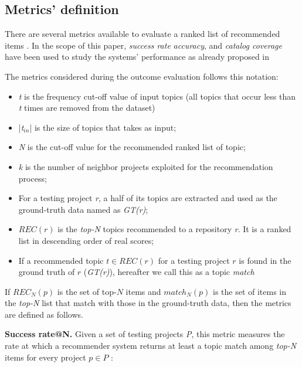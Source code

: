 \subsection{Metrics' definition}


There are several metrics available to evaluate a ranked list of recommended items \cite{DBLP:conf/rweb/NoiaO15}. In the scope of this paper, \emph{success rate} \emph{accuracy}, and \emph{catalog coverage} have been used to study the systems' performance as already proposed in \etal~\cite{Robillard:2014:RSS:2631387}



 The metrics considered during the outcome evaluation follows this notation:

\begin{itemize}[noitemsep,topsep=0pt]
	\item \emph{t} is the frequency cut-off value of input topics (\ie all topics that occur less than \emph{t} times are removed from the dataset)
	\item |\emph{t$_{in}$}| is the size of topics that \CT takes as input;
	\item \emph{N} is the cut-off value for the recommended ranked list of topic;%
	\item \emph{k} is the number of neighbor projects exploited for the recommendation process;
	\item For a testing project \emph{r}, a half of its topics are extracted and used as the ground-truth data named as \emph{GT(r)};
	\item $REC(r)$ is the \emph{top-N} topics recommended to a repository \emph{r}. It is a ranked list in descending order of real scores;
	\item If a recommended topic $t \in REC(r)$ for a testing project $r$ is found in the ground truth of $r$ (\ie \emph{GT(r)}), hereafter we call this as a topic \textit{match}
\end{itemize}



If $REC_{N}(p)$ is the set of top-$N$ items and $match_{N}(p)$ is the set of items in the \emph{top-N} list that match with those in the ground-truth data, then the metrics are defined as follows.  

\vspace{.1cm}
\noindent\textbf{Success rate@N.} Given a set of testing projects \emph{P}, this metric measures the rate at which a recommender system returns at least a topic match among \emph{top-N} items for every project $p \in P$ \cite{6671293}: %
\vspace{-.1cm}

